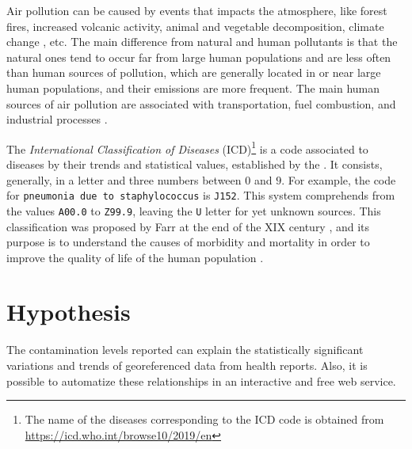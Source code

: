 \documentclass[
  11pt,
  a4paper,
  oneside
]{article}
\begin{document}
Air pollution can be caused by events that impacts the atmosphere, like forest fires, increased volcanic activity, animal and vegetable decomposition, climate change \citep{jacobEA2009}, etc. The main difference from natural and human pollutants is that the natural ones tend to occur far from large human populations and are less often than human sources of pollution, which are generally located in or near large human populations, and their emissions are more frequent. The main human sources of air pollution are associated with transportation, fuel combustion, and industrial processes \citep{fenger1999}.

The \emph{International Classification of Diseases} (ICD)\footnote{The name of the diseases corresponding to the ICD code is obtained from \url{https://icd.who.int/browse10/2019/en}} is a code associated to diseases by their trends and statistical values, established by the \citep{icd}. It consists, generally, in a letter and three numbers between $0$ and $9$. For example, the code for \texttt{pneumonia due to staphylococcus} is \texttt{J152}. This system comprehends from the values \texttt{A00.0} to \texttt{Z99.9}, leaving the \texttt{U} letter for yet unknown sources. This classification was proposed by Farr at the end of the XIX century \cite{who2011}, and its purpose is to understand the causes of morbidity and mortality in order to improve the quality of life of the human population \cite{who2011}.

\section{Hypothesis}
The contamination levels reported can explain the statistically significant variations and trends of georeferenced data from health reports. Also, it is possible to automatize these relationships in an interactive and free web service.
\end{document}
